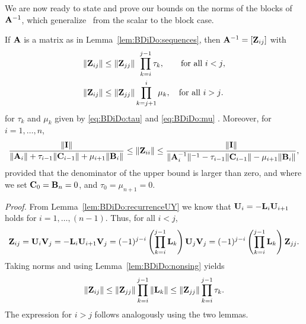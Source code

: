 We are now ready to state and prove our bounds on the norms of the blocks
of~$\mathbf{A}^{-1}$, which generalize~\cite[Theorems~3.1 and~3.2]{Nabben99} from the
scalar to the block case.

\begin{thm}\label{thm:BDiDo:blockbounds}
If $\mathbf{A}$ is a matrix as in Lemma~\ref{lem:BDiDo:sequences}, then $\mathbf{A}^{-1}=[\mathbf{Z}_{ij}]$
with
\begin{align}
\|\mathbf{Z}_{ij}\| & \leq\|\mathbf{Z}_{jj}\|\;\, \prod_{k=i}^{j-1}\tau_k,\qquad\text{for all $i<j$}, \label{eq:BDiDo:offdiagbound1}\\
\|\mathbf{Z}_{ij}\| & \leq\|\mathbf{Z}_{jj}\| \prod_{k=j+1}^{i}\mu_k,\quad\text{for all $i>j$}.\label{eq:BDiDo:offdiagbound2}
\end{align}
%
for $\tau_k$ and $\mu_k$ given by \eqref{eq:BDiDo:tau}  and \eqref{eq:BDiDo:mu} . Moreover, for $i=1,\dots,n$,
%
\begin{equation}\label{eq:BDiDo:diagbounds}
\frac{\|\I\|}{\|\A_i\|+\tau_{i-1}\|\C_{i-1}\|+\mu_{i+1}\|\B_{i}\|}
\leq
\|\Z_{ii}\|
\leq
\frac{\|\I\|}{\|\A_i^{-1}\|^{-1}-\tau_{i-1}\|\C_{i-1}\|-\mu_{i+1}\|\B_i\|}, %
\end{equation}
provided that the denominator of the upper bound is larger than zero,
and where we set $\mathbf{C}_0=\mathbf{B}_n=0$, and $\tau_0=\mu_{n+1}=0$.
\end{thm}


\emph{Proof.}
From Lemma~\ref{lem:BDiDo:recurrenceUY} we know that $\mathbf{U}_i=-\mathbf{L}_i\mathbf{U}_{i+1}$ holds
for $i=1,\dots,(n-1)$. Thus, for all $i<j$,
%
\[\mathbf{Z}_{ij}=\mathbf{U}_i\mathbf{V}_j=-\mathbf{L}_i\mathbf{U}_{i+1}\mathbf{V}_j
=(-1)^{j-i}\left(\prod_{k=i}^{j-1}\mathbf{L}_k\right)\mathbf{U}_j\mathbf{V}_j
=(-1)^{j-i}\left(\prod_{k=i}^{j-1}\mathbf{L}_k\right)\mathbf{Z}_{jj}.\]
%
Taking norms and using Lemma~\ref{lem:BDiDo:nonsing} yields
%
\[\|\mathbf{Z}_{ij}\|\leq
\|\mathbf{Z}_{jj}\|\prod_{k=i}^{j-1}\|\mathbf{L}_k\|\leq\|\mathbf{Z}_{jj}\|\prod_{k=i}^{j-1}\tau_k.\]
%
The expression for $i>j$ follows analogously using the two lemmas.
%

